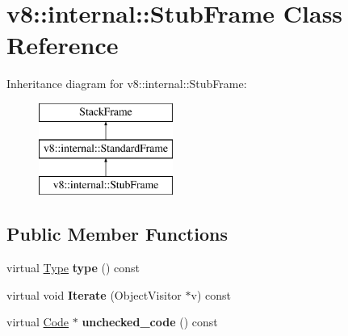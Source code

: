 \hypertarget{classv8_1_1internal_1_1_stub_frame}{}\section{v8\+:\+:internal\+:\+:Stub\+Frame Class Reference}
\label{classv8_1_1internal_1_1_stub_frame}
Inheritance diagram for v8\+:\+:internal\+:\+:Stub\+Frame\+:\begin{figure}[H]
\begin{center}
\leavevmode
\includegraphics[height=3.000000cm]{classv8_1_1internal_1_1_stub_frame}
\end{center}
\end{figure}
\subsection*{Public Member Functions}
\begin{DoxyCompactItemize}
\item 
\hypertarget{classv8_1_1internal_1_1_stub_frame_ae07a61c050a2e9d0902e1eb660d3c348}{}virtual \hyperlink{classv8_1_1internal_1_1_type_impl}{Type} {\bfseries type} () const \label{classv8_1_1internal_1_1_stub_frame_ae07a61c050a2e9d0902e1eb660d3c348}

\item 
\hypertarget{classv8_1_1internal_1_1_stub_frame_ac5fba7a700ffb7c9c9cf1e6261f7b574}{}virtual void {\bfseries Iterate} (Object\+Visitor $\ast$v) const \label{classv8_1_1internal_1_1_stub_frame_ac5fba7a700ffb7c9c9cf1e6261f7b574}

\item 
\hypertarget{classv8_1_1internal_1_1_stub_frame_a8f841581db423d0e02a2fb6101bb839d}{}virtual \hyperlink{classv8_1_1internal_1_1_code}{Code} $\ast$ {\bfseries unchecked\+\_\+code} () const \label{classv8_1_1internal_1_1_stub_frame_a8f841581db423d0e02a2fb6101bb839d}

\end{DoxyCompactItemize}
